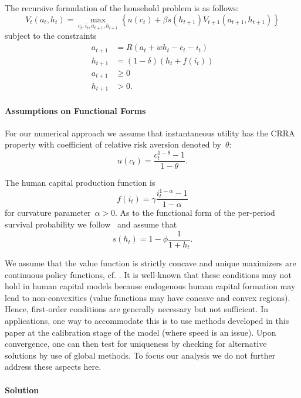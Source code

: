 \documentclass[a4paper,12pt]{article}%
\begin{document}
The recursive formulation of the household problem is as follows:
\[
V_{t}(a_{t},h_{t})=\underset{c_{t},i_{t},a_{t+1},h_{t+1}}{\max}\left\{
u(c_{t})+\beta s\left(  h_{t+1}\right)  V_{t+1}(a_{t+1},h_{t+1})\right\}
\]
subject to the constraints%
\begin{align}
a_{t+1}  &  =R\left(  a_{t}+wh_{t}-c_{t}-i_{t}\right) \nonumber\\
h_{t+1}  &  =\left(  1-\delta\right)  \left(  h_{t}+f\left(  i_{t}\right)
\right) \nonumber\\
a_{t+1}  &  \geq0\nonumber\\
h_{t+1}  &  >0. \label{eq:hinequ}%
\end{align}


\paragraph{Assumptions on Functional Forms}

For our numerical approach we assume that instantaneous utility has the CRRA
property with coefficient of relative risk aversion denoted by~$\theta$:
\[
u\left(  c_{t}\right)  =\frac{c_{t}^{1-\theta}-1}{1-\theta}.
\]


The human capital production function is%
\[
f\left(  i_{t}\right)  =\gamma\frac{i_{t}^{1-\alpha}-1}{1-\alpha}%
\]
for curvature parameter~$\alpha>0$. As to the functional form of the
per-period survival probability we follow~%
and assume that
\[
s\left(  h_{t}\right)  =1-\phi\frac{1}{1+h_{t}}\text{.}%
\]


We assume that the value function is strictly concave and unique maximizers
are continuous policy functions, cf.
%
. It is well-known that these conditions may not hold in human capital models
because endogenous human capital formation may lead to non-convexities (value
functions may have concave and convex regions). Hence, first-order conditions
are generally necessary but not sufficient. In applications, one way to
accommodate this is to use methods developed in this paper at the calibration
stage of the model (where speed is an issue). Upon convergence, one can then
test for uniqueness by checking for alternative solutions by use of global
methods. To focus our analysis we do not further address these aspects here.

\paragraph{Solution}
\end{document}
